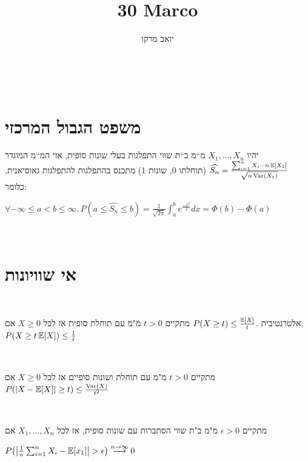 \documentclass[8pt,twocolumn]{extarticle}
\title{30 Marco}
\author{יואב מרקו}
\begin{document}
‏\section{משפט הגבול המרכזי}
יהיו $X_{1},...,X_{n}$ מ“מ ב“ת שווי התפלגות בעלי שונות
סופית, אזי המ“מ המוגדר $\widehat{S_{n}}=\frac{\sum_{i=1}^{n}X_{i}-n\EX\left[X_{1}\right]}{\sqrt{n\Var\left(X_{1}\right)}}$
(תוחלתו 0, שונות 1) מתכנס בהתפלגות להתפלגות גאוסיאנית, כלומר:

\hspace*{\fill}
\(\displaystyle
\forall -\infty\leq a<b\leq\infty.\
P\left(a\leq\widehat{S_{n}}\leq b\right)=\frac{1}{\sqrt{2\pi}}\int_{a}^{b}e^{\frac{-x^{2}}{2}}dx=\varPhi\left(b\right)-\varPhi\left(a\right)\)

‏\section{אי שוויונות} ‏\begin{claim}[א"ש מרקוב]
  אם ‎\(X\geq 0\) מ"מ עם תוחלת סופית אז לכל ‎\(t>0\) מתקיים
  ‎\(P(X\geq t)\\ \leq  \frac{\operatorname*{\mathbb{E}}[X]}{t}\).
  אלטרנטיבית, ‎\(P(X \geq t \operatorname*{\mathbb{E}}[X]) \leq \frac{1}{t}\) ‏\end{claim}
‏\begin{claim}[א"ש צ'בישב] אם ‎\(X\geq 0\) מ"מ עם תוחלת ושונות סופיים
  אז לכל ‎\(t>0\) מתקיים ‎\( P(\abs{X - \EX[X]} \geq t) \leq \frac{\Var(X)}{t^2} \)
  ‏\end{claim}
‏\begin{theorem}
אם ‎\(X_1, \dots ,X_n\) מ"מ ב"ת שווי הסתברות עם שונות סופית, אז לכל ‎\(\epsilon >0\) מתקיים

\hspace*{\fill}
‎\( P\left(\abs{\frac{1}{n} \sum_{i=1}^n X_i - \EX[x_1]} > \epsilon\right) \overset{n\to \infty}{\longrightarrow} 0 \)
\hspace*{\fill}
‏\end{theorem}
\vspace{-1em}
\end{document}
